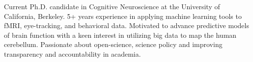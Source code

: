 

\begin{cvparagraph}

Current Ph.D. candidate in Cognitive Neuroscience at the University of California, Berkeley. 5+ years experience in applying machine learning tools to fMRI, eye-tracking, and behavioral data. Motivated to advance predictive models of brain function with a keen interest in 
utilizing big data to map the human cerebellum. Passionate about open-science, science policy and improving transparency and accountability in academia. 

\end{cvparagraph}
